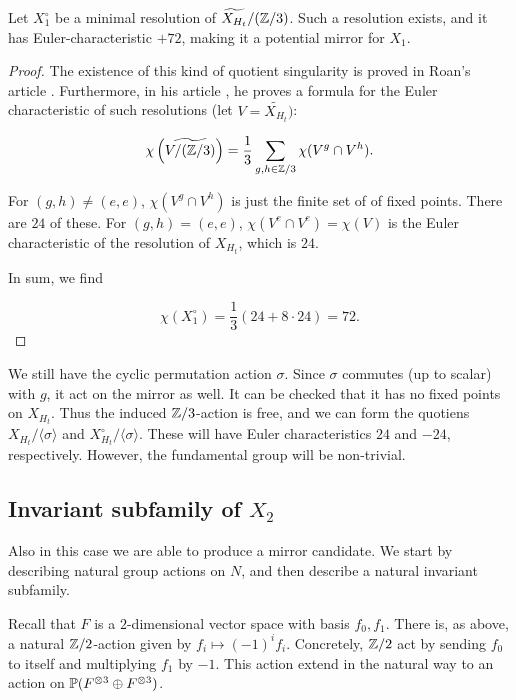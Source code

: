 \begin{theorem}
Let $X_1^\circ$ be a minimal resolution of $\widetilde{X_{H_t}}/(\Z/3)$. Such a resolution exists, and it has Euler-characteristic $+72$, making it a potential mirror for $X_1$.
\end{theorem}
\begin{proof}
The existence of this kind of quotient singularity is proved in Roan's article \cite{roan_minres}. Furthermore, in his article \cite{roan_euler}, he proves a formula for the Euler characteristic of such resolutions (let $V=\widetilde{X_{H_t}})$:

\[
\chi\left(\widetilde{V/(\Z/3)} \right) = \frac{1}{3} \sum_{g,h \in \Z/3}  \chi(V^g \cap V^h).
\]

For $(g,h) \neq (e,e)$, $\chi(V^g \cap V^h)$ is just the finite set of of fixed points. There are $24$ of these. For $(g,h)=(e,e)$, $\chi(V^e \cap V^e)=\chi(V)$ is the Euler characteristic of the resolution of $X_{H_t}$, which is $24$.

In sum, we find

$$
\chi(X_1^\circ) = \frac 13 \left(24 + 8 \cdot 24\right)=72.
$$
\end{proof}

\begin{remark}
We still have the cyclic permutation action $\sigma$. Since $\sigma$ commutes (up to scalar) with $g$, it act on the mirror as well. It can be checked that it has no fixed points on $X_{H_t}$. Thus the induced $\Z/3$-action is free, and we can form the quotiens $X_{H_t}/\langle \sigma \rangle $ and $X_{H_t}^\circ/\langle \sigma \rangle$. These will have Euler characteristics $24$ and $-24$, respectively. However, the fundamental group will be non-trivial.
\end{remark}

\subsection{Invariant subfamily of $X_2$}

Also in this case we are able to produce a mirror candidate. We start by describing natural group actions on $N$, and then describe a natural invariant subfamily. 

Recall that $F$ is a $2$-dimensional vector space with basis $f_0, f_1$. There is, as above, a natural $\Z/2$-action given by $f_i \mapsto (-1)^i f_i$. Concretely, $\Z/2$ act by sending $f_0$ to itself and multiplying $f_1$ by $-1$. This action extend in the natural way to an action on $\P(F^{\otimes 3} \oplus F^{\otimes 3})$.

